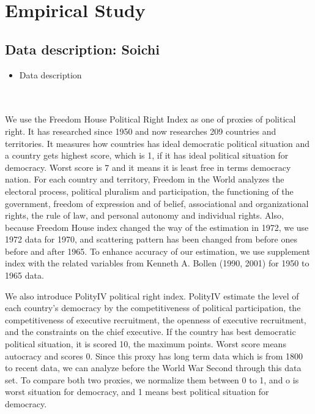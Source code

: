 \section{Empirical Study}\label{Sec:empirical}
\subsection{Data description: Soichi}
\begin{itemize}
	\item Data description
\end{itemize}

\\

\\

We use the Freedom House Political Right Index as one of proxies of political right. It has researched since 1950 and now researches 209 countries and territories. It measures how countries has ideal democratic political situation and a country gets highest score, which is 1, if it has ideal political situation for democracy. Worst score is 7 and it means it is least free in terms democracy nation. For each country and territory, Freedom in the World analyzes the electoral process, political pluralism and participation, the functioning of the government, freedom of expression and of belief, associational and organizational rights, the rule of law, and personal autonomy and individual rights. Also, because Freedom House index changed the way of the estimation in 1972, we use 1972 data for 1970, and scattering pattern has been changed from before ones before and after 1965.  To enhance accuracy of our estimation, we use supplement index with the related variables from Kenneth A. Bollen (1990, 2001) for 1950 to 1965 data.


We also introduce PolityI\hspace{-.1em}V political right index. PolityI\hspace{-.1em}V estimate the level of each country’s democracy by the competitiveness of political participation, the competitiveness of executive recruitment, the openness of executive recruitment, and the constraints on the chief executive. If the country has best democratic political situation, it is scored 10, the maximum points. Worst score means autocracy and scores 0. Since this proxy has long term data which is from 1800 to recent data, we can analyze before the World War Second through this data set. To compare both two proxies, we normalize them between 0 to 1, and o is worst situation for democracy, and 1 means best political situation for democracy. 


